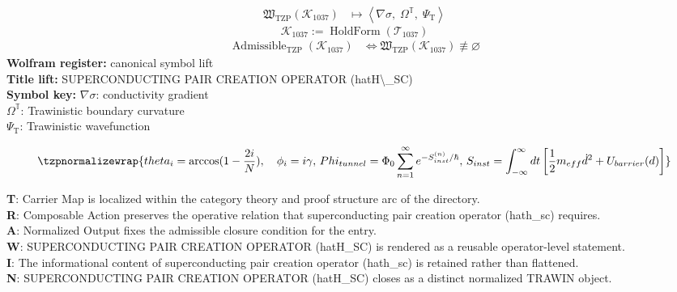 \noindent
\begin{minipage}[t]{0.48\linewidth}
\begingroup
\small
\[
\begin{aligned}
\mathfrak{W}_{\mathrm{TZP}}\!\left(\mathcal{K}_{1037}\right)
&\longmapsto
\left\langle \nabla\sigma,\; \Omega^{\mathbb{T}},\; \Psi_{\mathrm{T}} \right\rangle
\end{aligned}
\]
\[
\mathcal{K}_{1037}
:=
\operatorname{HoldForm}\!\left(\mathcal{T}_{1037}\right)
\]
\[
\begin{aligned}
\operatorname{Admissible}_{\mathrm{TZP}}\!\left(\mathcal{K}_{1037}\right)
&\Longleftrightarrow
\mathfrak{W}_{\mathrm{TZP}}\!\left(\mathcal{K}_{1037}\right)\not\equiv\varnothing
\end{aligned}
\]
\textbf{Wolfram register:} canonical symbol lift\\
\textbf{Title lift:} SUPERCONDUCTING PAIR CREATION OPERATOR (hatH\textbackslash{}\_SC)\\
\textbf{Symbol key:} \(\nabla\sigma\): conductivity gradient\\ \(\Omega^{\mathbb{T}}\): Trawinistic boundary curvature\\ \(\Psi_{\mathrm{T}}\): Trawinistic wavefunction
\par
\endgroup
\end{minipage}\hfill
\begin{minipage}[t]{0.48\linewidth}
\[
\tzpnormalizewrap{theta_i = \arccos(1 - \frac{2i}{N}), \quad \phi_i = i\gamma,\,Phi_{tunnel} = \Phi_0 \sum_{n=1}^{\infty} e^{-S_{inst}^{(n)}/\hbar},\,S_{inst} = \int_{-\infty}^{\infty} dt \left[\frac{1}{2}m_{eff}\dot{d}^2 + U_{barrier}(d)\right]}
\]

\small
\textbf{T}: Carrier Map is localized within the category theory and proof structure arc of the directory.\\
\textbf{R}: Composable Action preserves the operative relation that superconducting pair creation operator (hath\_sc) requires.\\
\textbf{A}: Normalized Output fixes the admissible closure condition for the entry.\\
\textbf{W}: SUPERCONDUCTING PAIR CREATION OPERATOR (hatH\_SC) is rendered as a reusable operator-level statement.\\
\textbf{I}: The informational content of superconducting pair creation operator (hath\_sc) is retained rather than flattened.\\
\textbf{N}: SUPERCONDUCTING PAIR CREATION OPERATOR (hatH\_SC) closes as a distinct normalized TRAWIN object.
\normalsize
\end{minipage}

